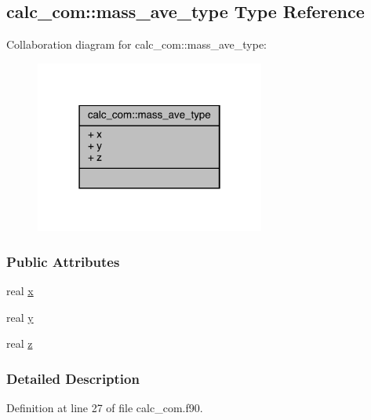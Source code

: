 \hypertarget{structcalc__com_1_1mass__ave__type}{\subsection{calc\-\_\-com\-:\-:mass\-\_\-ave\-\_\-type Type Reference}
\label{structcalc__com_1_1mass__ave__type}
}


Collaboration diagram for calc\-\_\-com\-:\-:mass\-\_\-ave\-\_\-type\-:
\nopagebreak
\begin{figure}[H]
\begin{center}
\leavevmode
\includegraphics[width=214pt]{structcalc__com_1_1mass__ave__type__coll__graph}
\end{center}
\end{figure}
\subsubsection*{Public Attributes}
\begin{DoxyCompactItemize}
\item 
real \hyperlink{structcalc__com_1_1mass__ave__type_a39bc0721c8f812198dcdef36e9c2db09}{x}
\item 
real \hyperlink{structcalc__com_1_1mass__ave__type_a133df3936119eab320d7b7538eaf7dd2}{y}
\item 
real \hyperlink{structcalc__com_1_1mass__ave__type_a3e3c76a0ea6e86e651beccf7aaa396b6}{z}
\end{DoxyCompactItemize}


\subsubsection{Detailed Description}


Definition at line 27 of file calc\-\_\-com.\-f90.




